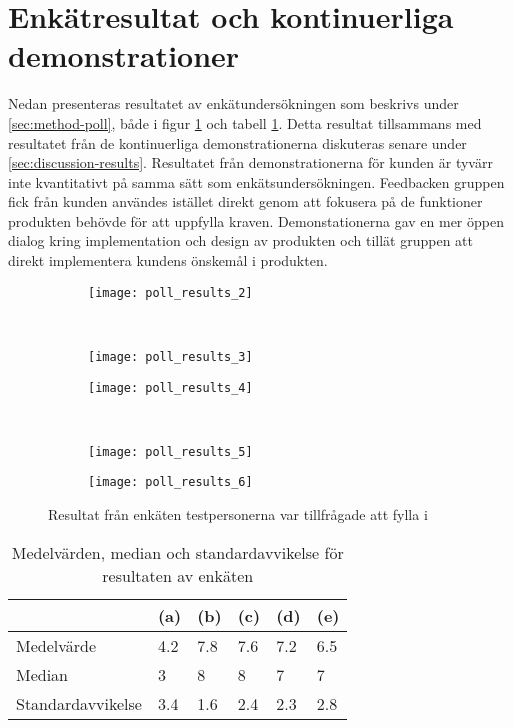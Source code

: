 \section{Enkätresultat och kontinuerliga demonstrationer}

Nedan presenteras resultatet av enkätundersökningen som beskrivs under \ref{sec:method-poll}, både i figur \ref{fig:poll_results} och tabell \ref{tab:poll_results_table}. Detta resultat tillsammans med resultatet från de kontinuerliga demonstrationerna diskuteras senare under \ref{sec:discussion-results}. Resultatet från demonstrationerna för kunden är tyvärr inte kvantitativt på samma sätt som enkätsundersökningen. Feedbacken gruppen fick från kunden användes istället direkt genom att fokusera på de funktioner produkten behövde för att uppfylla kraven. Demonstationerna gav en mer öppen dialog kring implementation och design av produkten och tillät gruppen att direkt implementera kundens önskemål i produkten.

\begin{figure}
    \centering
    \begin{subfigure}[]{0.5\textwidth}
        \centering
        \texttt{[image: poll\_results\_2]}
        \caption{}
    \end{subfigure}%
    ~
    \begin{subfigure}[]{0.5\textwidth}
        \centering
        \texttt{[image: poll\_results\_3]}
        \caption{}
    \end{subfigure}

    \begin{subfigure}[]{0.5\textwidth}
        \centering
        \texttt{[image: poll\_results\_4]}
        \caption{}
    \end{subfigure}%
    ~
    \begin{subfigure}[]{0.5\textwidth}
        \centering
        \texttt{[image: poll\_results\_5]}
        \caption{}
    \end{subfigure}

    \begin{subfigure}[]{0.5\textwidth}
        \centering
        \texttt{[image: poll\_results\_6]}
        \caption{}
    \end{subfigure}%
    \caption{Resultat från enkäten testpersonerna var tillfrågade att fylla i}
    \label{fig:poll_results}
\end{figure}

\begin{table}
    \centering
    \begin{tabular}{| l | l | l | l | l | l |}
        \cline{2-6}
        \multicolumn{1}{c|}{} & (a) & (b) & (c) & (d) & (e) \\ \hline
        Medelvärde & 4.2 & 7.8 & 7.6 & 7.2 & 6.5  \\ \hline
        Median & 3 & 8 & 8 & 7 & 7  \\ \hline
        Standardavvikelse & 3.4 & 1.6 & 2.4 & 2.3 & 2.8  \\ \hline
    \end{tabular}
    \caption{Medelvärden, median och standardavvikelse för resultaten av enkäten}
    \label{tab:poll_results_table}
\end{table}
